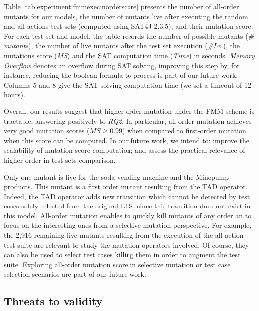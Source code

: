 Table \ref{tab:experiment:fmmexec:norderscore} presents the number of all-order mutants for our models, the number of mutants live after executing the random and all-actions test sets (computed using SAT4J 2.3.5), and their mutation score. For each test set and model, the table records the number of possible mutants (\textit{\# mutants}), the number of live mutants after the test set execution (\textit{\#Lv.}), the mutations score (\textit{MS}) and the SAT computation time (\textit{Time}) in seconds. \textit{Memory Overflow} denotes an overflow during SAT solving, improving this step by, for instance, reducing the boolean formula to process is part of our future work. Columns 5 and 8 give the SAT-solving computation time (we set a timeout of 12 hours). 

Overall, our results suggest that higher-order mutation under the FMM scheme is tractable, answering positively to \emph{RQ2}.  In particular, all-order mutation achieves very good mutation scores ($MS \geq 0.99$) when compared to first-order mutation when this score can be computed. In our future work, we intend to: improve the scalability of mutation score computation; and assess the practical relevance of higher-order in test sets comparison.

Only one mutant is live for the soda vending machine and the Minepump products. This mutant is a first order mutant resulting from the TAD operator. Indeed, the TAD operator adds new transition which cannot be detected by test cases solely selected from the original LTS, since this transition does not exist in this model. All-order mutation enables to quickly kill mutants of any order an to focus on the interesting ones from a selective mutation perspective. For example, the 2,916 remaining live mutants resulting from the execution of the all-action test suite are relevant to study the mutation operators involved. Of course, they can also be used to select test cases killing them in order to augment the test suite. Exploring all-order mutation score in selective mutation or test case selection scenarios are part of our future work.  

\subsection{Threats to validity}


